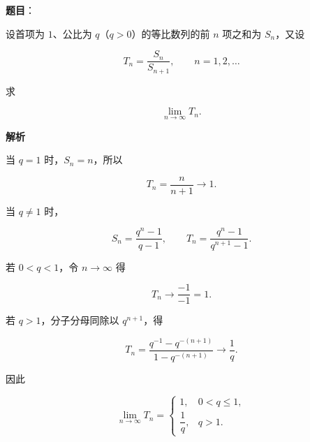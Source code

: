 \begin{answer}

\textbf{题目}：

设首项为 $1$、公比为 $q$（$q>0$）的等比数列的前 $n$ 项之和为 $S_n$，又设

\nopagebreak[4]
\[
T_n=\frac{S_n}{S_{n+1}},\qquad n=1,2,\ldots
\]

求

\nopagebreak[4]
\[
\lim_{n\to\infty}T_n.
\]

\textbf{解析}

当 $q=1$ 时，$S_n=n$，所以

\nopagebreak[4]
\[
T_n=\frac n{n+1}\longrightarrow1.
\]

当 $q\ne1$ 时，

\nopagebreak[4]
\[
S_n=\frac{q^n-1}{q-1},
\qquad
T_n=\frac{q^n-1}{q^{n+1}-1}.
\]

若 $0<q<1$，令 $n\to\infty$ 得

\nopagebreak[4]
\[
T_n\longrightarrow\frac{-1}{-1}=1.
\]

若 $q>1$，分子分母同除以 $q^{n+1}$，得

\nopagebreak[4]
\[
T_n=\frac{q^{-1}-q^{-(n+1)}}{1-q^{-(n+1)}}
\longrightarrow\frac1q.
\]

因此

\nopagebreak[4]
\[
\lim_{n\to\infty}T_n=
\begin{cases}
1,&0<q\le1,\\[2pt]
\dfrac1q,&q>1.
\end{cases}
\]


\end{answer}
